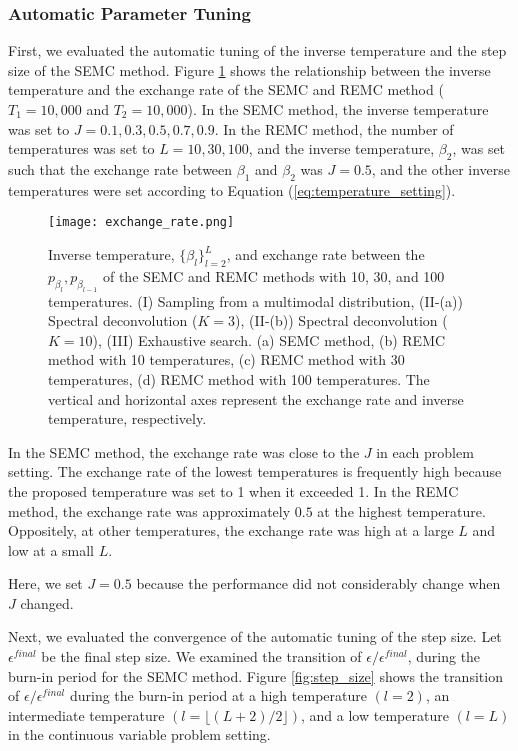 \documentclass[12pt]{article}
\begin{document}
\subsubsection{Automatic Parameter Tuning}
First, we evaluated the automatic tuning of the inverse temperature and the step size of the SEMC method.
Figure \ref{fig:temperature_setting} shows the relationship between the inverse temperature and the exchange rate of the SEMC and REMC method
($T_1 = 10{,}000$ and $T_2 = 10{,}000$).
In the SEMC method, the inverse temperature was set to $J = 0.1, 0.3, 0.5, 0.7, 0.9$. 
In the REMC method, the number of temperatures was set to $ L = 10, 30, 100$, and the inverse temperature, $\beta_2$, was set such that the exchange rate between $\beta_1$ and $\beta_2$ was $J = 0.5$, and the other inverse temperatures were set according to Equation (\ref{eq:temperature_setting}). \par
\begin{figure}[h]
  \centering
  \texttt{[image: exchange\_rate.png]}
  \caption{Inverse temperature, $\{\beta_l\}_{l=2}^L$, and exchange rate between the $p_{\beta_l}, p_{\beta_{l-1}}$ of the SEMC and REMC methods with 10, 30, and 100 temperatures. (I) Sampling from a multimodal distribution, (II-(a)) Spectral deconvolution ($K=3$), (II-(b)) Spectral deconvolution ($K=10$), (III) Exhaustive search. (a) SEMC method, (b) REMC method with 10 temperatures, (c) REMC method with 30 temperatures, (d) REMC method with 100 temperatures. The vertical and horizontal axes represent the exchange rate and inverse temperature, respectively.}
  \label{fig:temperature_setting}
\end{figure}
In the SEMC method, the exchange rate was close to the $J$ in each problem setting.
The exchange rate of the lowest temperatures is frequently high because the proposed temperature was set to 1 when it exceeded 1.
In the REMC method, the exchange rate was approximately $0.5$ at the highest temperature.
Oppositely, at other temperatures, the exchange rate was high at a large $L$ and low at a small $L$. \par
Here, we set $J = 0.5$ because the performance did not considerably change when $J$ changed. \par
Next, we evaluated the convergence of the automatic tuning of the step size.
Let $\epsilon^{final}$ be the final step size.
We examined the transition of $\epsilon/\epsilon^{final}$, during the burn-in period for the SEMC method.
Figure \ref{fig:step_size} shows the transition of $\epsilon/\epsilon^{final}$ during the burn-in period at a high temperature $(l = 2)$, an intermediate temperature $(l = \lfloor (L+2)/2 \rfloor)$, and a low temperature $(l = L)$ in the continuous variable problem setting.
\end{document}
